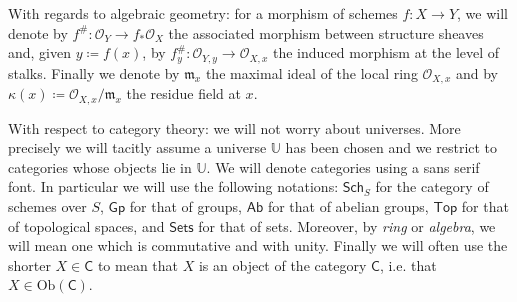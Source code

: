 With regards to algebraic geometry: for a morphism of schemes $f\colon X \to Y$,
we will denote by $f^{\#}\colon \mathcal{O}_{ Y } \to f_*\mathcal{O}_{ X }$ the
associated morphism between structure sheaves and, given $y \coloneqq f(x)$,
by $f_y^{\#}\colon \mathcal{O}_{ Y,y } \to \mathcal{O}_{ X,x }$ the induced morphism
at the level of stalks.
Finally we denote by $\mathfrak{m}_x$ the maximal ideal of the local ring
$\mathcal{O}_{ X,x }$ and by $\kappa(x) \coloneqq \mathcal{O}_{ X,x }/\mathfrak{m}_x$
the residue field at $x$.

With respect to category theory:
we will not worry about universes. More precisely we will
tacitly assume a universe $\mathbb{U}$ has been chosen
and we restrict to categories whose objects lie in $\mathbb{U}$.
We will denote categories using a sans serif font.
In particular we will use the following notations:
$\mathsf{Sch}_{S}$ for the category of schemes over $S$,
$\mathsf{Gp}$ for that of groups,
$\mathsf{Ab}$ for that of abelian groups,
$\mathsf{Top}$ for that of topological spaces,
and $\mathsf{Sets}$ for that of sets.
Moreover, by {\em ring} or {\em algebra}, we will mean one which is commutative and with unity.
Finally we will often use the shorter $X \in \mathsf{C}$ to mean that $X$ is an object
of the category $\mathsf{C}$, i.e. that $X \in \mathrm{Ob} \left(\mathsf{C}\right)$.
